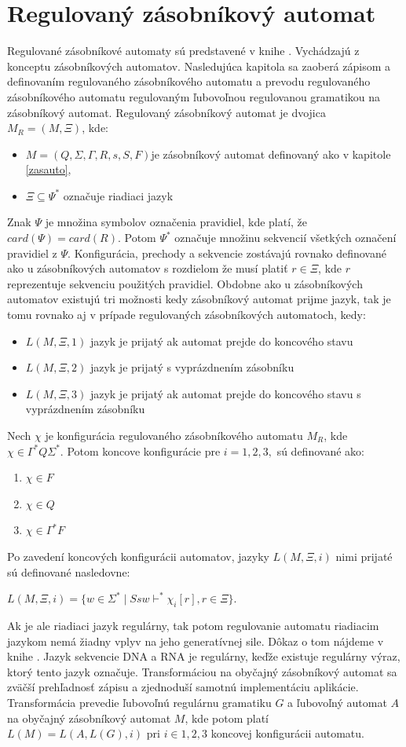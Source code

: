 \section{Regulovaný zásobníkový automat}
\label{regzas}
Regulované zásobníkové automaty sú predstavené v knihe \cite{Reggram}. Vychádzajú z konceptu zásobníkových automatov. Nasledujúca kapitola sa zaoberá zápisom a definovaním regulovaného zásobníkového automatu a prevodu regulovaného zásobníkového automatu regulovaným ľubovoľnou regulovanou gramatikou na zásobníkový automat. Regulovaný zásobníkový automat je dvojica $M_R = (M, \Xi)$, kde:
\begin{itemize}
\item $M = (Q, \Sigma, \Gamma, R, s, S, F) $je zásobníkový automat definovaný ako v kapitole \ref{zasauto},
\item $ \Xi \subseteq \Psi^\ast$ označuje riadiaci jazyk 
\end{itemize} 
Znak $\Psi$ je množina symbolov označenia pravidiel, kde platí, že $card(\Psi) = card(R)$. Potom $\Psi^\ast$ označuje množinu sekvencií všetkých označení pravidiel z $\Psi$. Konfigurácia, prechody a sekvencie zostávajú rovnako definované ako u zásobníkových automatov s rozdielom že musí platiť $r \in \Xi$, kde $r$ reprezentuje sekvenciu použitých pravidiel. Obdobne ako u zásobníkových automatov existujú tri možnosti kedy zásobníkový automat prijme jazyk, tak je tomu rovnako aj v prípade regulovaných zásobníkových automatoch, kedy:
\begin{itemize}
\item $L(M, \Xi, 1)$ jazyk je prijatý ak automat prejde do koncového stavu
\item $L(M, \Xi, 2)$ jazyk je prijatý s vyprázdnením zásobníku
\item $L(M, \Xi, 3)$ jazyk je prijatý ak automat prejde do koncového stavu s vyprázdnením zásobníku
\end{itemize}
Nech $\chi$ je konfigurácia regulovaného zásobníkového automatu $M_R$, kde $\chi \in \Gamma^\ast Q \Sigma^\ast$. Potom koncove konfigurácie pre $i =1, 2, 3,$ sú definované ako:
\begin{enumerate}
\item $\chi \in F$
\item $\chi \in Q$
\item $\chi \in \Gamma^\ast F$ 
\end{enumerate}
Po zavedení koncových konfigurácii automatov, jazyky $L(M, \Xi, i)$ nimi prijaté sú definované nasledovne:
\begin{center}
$L(M, \Xi, i) = \{w \in \Sigma^\ast \mid Ssw \vdash^\ast \chi_i [r], r \in \Xi\}$.
\end{center}
Ak je ale riadiaci jazyk regulárny, tak potom regulovanie automatu riadiacim jazykom nemá žiadny vplyv na jeho generatívnej sile. Dôkaz o tom nájdeme v knihe \cite{Reggram}. Jazyk sekvencie DNA a RNA je regulárny, keďže existuje regulárny výraz, ktorý tento jazyk označuje. Transformáciou na obyčajný zásobníkový automat sa zväčší prehľadnosť zápisu a zjednoduší samotnú implementáciu aplikácie. Transformácia prevedie ľubovoľnú regulárnu gramatiku $G$ a ľubovoľný automat $A$ na obyčajný zásobníkový automat $M$, kde potom platí $L(M) = L(A, L(G), i)$ pri $ i \in {1, 2, 3} $ koncovej konfigurácii automatu. 

